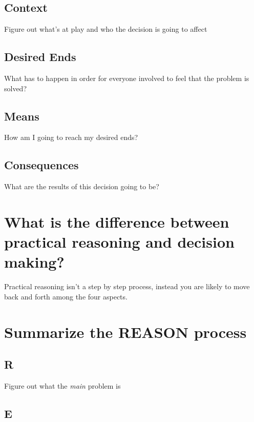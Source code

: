 \documentclass[11pt]{article}
\begin{document}
\subsection*{Context}
\label{sec:orgc2550ac}

Figure out what's at play and who the decision is going to affect

\subsection*{Desired Ends}
\label{sec:org33b9929}

What has to happen in order for everyone involved to feel that the problem is solved?

\subsection*{Means}
\label{sec:orgea22597}

How am I going to reach my desired ends?

\subsection*{Consequences}
\label{sec:orgc83e2c1}

What are the results of this decision going to be?

\section*{What is the difference between practical reasoning and decision making?}
\label{sec:orgf33e189}

Practical reasoning isn't a step by step process, instead you are likely to move back and forth among the four aspects.

\section*{Summarize the REASON process}
\label{sec:org0a8f3cc}

\subsection*{R}
\label{sec:orgeea8bb8}

Figure out what the \emph{main} problem is

\subsection*{E}
\label{sec:org21f80a5}
\end{document}

